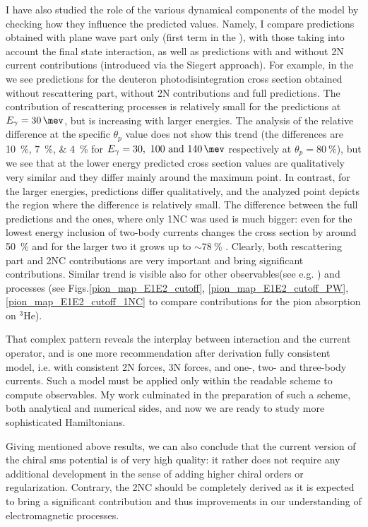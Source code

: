 I have also studied the role of the various dynamical components of the model by checking 
how they influence the predicted values.
Namely, I compare predictions obtained with plane wave part only (first term in the ),
with those taking into account the final state interaction,
as well as predictions with and without 2N current contributions (introduced via the Siegert approach).
For example, in the  we see predictions for the deuteron photodisintegration 
cross section obtained 
without rescattering part, without 2N contributions and full predictions.
The contribution of rescattering processes is relatively small for the predictions at $E_\gamma = \SI{30}{\mev}$,
but is increasing with larger energies. The analysis of the relative difference at the specific 
$\theta_p$ value does not show this trend (the differences are \SIlist{10;7;4}{\percent} 
for $E_\gamma=\SIlist[list-units = single]{30;100;140}{\mev}$ respectively at $\theta_p=\SI{80}{\percent}$),
but we see that
at the lower energy predicted cross section values are qualitatively very similar and they differ
mainly around the maximum point.
In contrast, for the larger energies, predictions differ qualitatively, and the analyzed point 
depicts the region where the difference is relatively small.
The difference between the full predictions and the ones, where only 1NC was used is much bigger:
even for the lowest energy inclusion of two-body currents changes the cross section 
by around \SI{50}{\percent} and for the larger two it grows up to $\sim\SI{78}{\percent}$ .
Clearly, both rescattering part and 2NC contributions are very important and bring significant contributions.
Similar trend is visible also for other observables(see e.g. ) and processes 
(see Figs.\ref{pion_map_E1E2_cutoff}, \ref{pion_map_E1E2_cutoff_PW}, \ref{pion_map_E1E2_cutoff_1NC}
to compare contributions for the pion absorption on $^3$He).

That complex pattern reveals the interplay between interaction and the current operator, and
is one more recommendation after derivation fully consistent model, i.e. with consistent 2N
forces, 3N forces, and one-, two- and three-body currents.
Such a model must be applied only within the readable scheme to compute observables.
My work culminated in the preparation of such a scheme, both analytical and numerical
sides, and now we are ready to study more sophisticated Hamiltonians.

Giving mentioned above results, we can also conclude that the current version of 
the chiral \gls{sms} potential is of very high quality:
it rather does not require any additional development in the sense of adding higher chiral orders or regularization.
Contrary, the 2NC should be completely derived as it is expected to bring 
a significant contribution and thus improvements in our understanding of electromagnetic processes.

